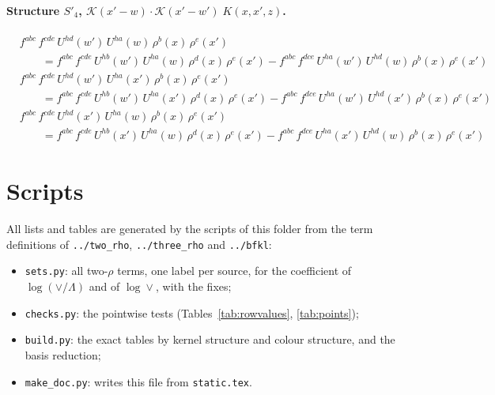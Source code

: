 \documentclass[10pt]{article}
\numberwithin{equation}{section}
\newcommand{\KK}{\mathcal K}
\begin{document}
\paragraph{Structure $S'_{4}$, $\KK(x'-w)\cdot\KK(x'-w')\;K(x,x',z)$.}
\begin{align*}
&f^{abc}\,f^{cde}\,U^{hd}(w')\,U^{ha}(w)\,\rho^{b}(x)\,\rho^{e}(x')\\&\qquad=f^{abc}\,f^{cde}\,U^{hb}(w')\,U^{ha}(w)\,\rho^{d}(x)\,\rho^{e}(x')-f^{abc}\,f^{dce}\,U^{ha}(w')\,U^{hd}(w)\,\rho^{b}(x)\,\rho^{e}(x')\\&f^{abc}\,f^{cde}\,U^{hd}(w')\,U^{ha}(x')\,\rho^{b}(x)\,\rho^{e}(x')\\&\qquad=f^{abc}\,f^{cde}\,U^{hb}(w')\,U^{ha}(x')\,\rho^{d}(x)\,\rho^{e}(x')-f^{abc}\,f^{dce}\,U^{ha}(w')\,U^{hd}(x')\,\rho^{b}(x)\,\rho^{e}(x')\\&f^{abc}\,f^{cde}\,U^{hd}(x')\,U^{ha}(w)\,\rho^{b}(x)\,\rho^{e}(x')\\&\qquad=f^{abc}\,f^{cde}\,U^{hb}(x')\,U^{ha}(w)\,\rho^{d}(x)\,\rho^{e}(x')-f^{abc}\,f^{dce}\,U^{ha}(x')\,U^{hd}(w)\,\rho^{b}(x)\,\rho^{e}(x')
\end{align*}

\section{Scripts}\label{app:scripts}
All lists and tables are generated by the scripts of this folder from the term definitions of \texttt{../two\_rho}, \texttt{../three\_rho} and \texttt{../bfkl}:
\begin{itemize}
\item \texttt{sets.py}: all two-$\rho$ terms, one label per source, for the coefficient of $\log(\vee/\Lambda)$ and of $\log\vee$, with the fixes;
\item \texttt{checks.py}: the pointwise tests (Tables~\ref{tab:rowvalues}, \ref{tab:points});
\item \texttt{build.py}: the exact tables by kernel structure and colour structure, and the basis reduction;
\item \texttt{make\_doc.py}: writes this file from \texttt{static.tex}.
\end{itemize}
\end{document}
